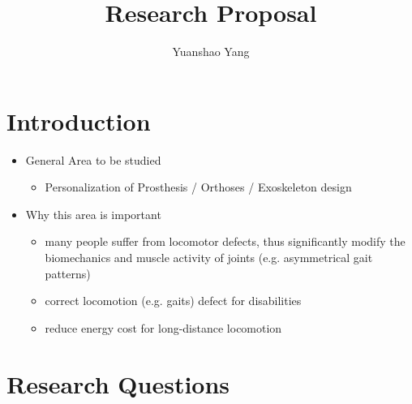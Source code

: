 \documentclass{article}
\title{Research Proposal}
\author{Yuanshao Yang}
\affil{Department of Mechanical Engineering, Univereity of Michigan}
\date{}
\begin{document}
\maketitle


\section{Introduction}
\begin{itemize}
    \item General Area to be studied
    \begin{itemize}
        \item Personalization of Prosthesis / Orthoses / Exoskeleton design \cite{PersonalizeMain}
    \end{itemize}
    \item Why this area is important
    \begin{itemize}
        \item many people suffer from locomotor defects, thus significantly modify the biomechanics and muscle activity of joints (e.g. asymmetrical gait patterns) \cite{GaitAdjustment}
        \item correct locomotion (e.g. gaits) defect for disabilities \cite{GaitCorrection}
        \item reduce energy cost for long-distance locomotion \cite{ReduceEnergyCost}
    \end{itemize}
\end{itemize}



\section{Research Questions}
\end{document}
